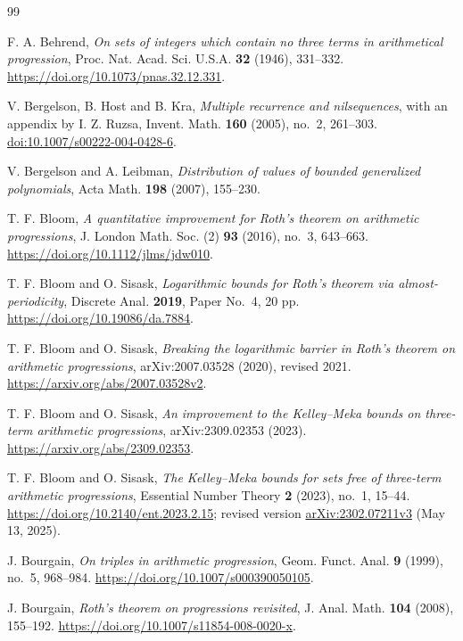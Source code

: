 \begin{thebibliography}{99}
\raggedright

F. A. Behrend, \emph{On sets of integers which contain no three terms in
arithmetical progression}, Proc. Nat. Acad. Sci. U.S.A. \textbf{32} (1946),
331--332. \url{https://doi.org/10.1073/pnas.32.12.331}.

V. Bergelson, B. Host and B. Kra, \emph{Multiple recurrence and nilsequences},
with an appendix by I. Z. Ruzsa,
Invent. Math. \textbf{160} (2005), no.~2, 261--303.
\href{https://doi.org/10.1007/s00222-004-0428-6}{doi:10.1007/s00222-004-0428-6}.

V. Bergelson and A. Leibman, \emph{Distribution of values of bounded
generalized polynomials}, Acta Math. \textbf{198} (2007), 155--230.

T. F. Bloom, \emph{A quantitative improvement for Roth's theorem on arithmetic
progressions}, J. London Math. Soc. (2) \textbf{93} (2016), no.~3, 643--663.
\url{https://doi.org/10.1112/jlms/jdw010}.

T. F. Bloom and O. Sisask, \emph{Logarithmic bounds for Roth's theorem via
almost-periodicity}, Discrete Anal. \textbf{2019}, Paper No.~4, 20 pp.
\url{https://doi.org/10.19086/da.7884}.

T. F. Bloom and O. Sisask, \emph{Breaking the logarithmic barrier in Roth's
theorem on arithmetic progressions}, arXiv:2007.03528 (2020), revised 2021.
\url{https://arxiv.org/abs/2007.03528v2}.

T. F. Bloom and O. Sisask, \emph{An improvement to the Kelley--Meka bounds on
three-term arithmetic progressions}, arXiv:2309.02353 (2023).
\url{https://arxiv.org/abs/2309.02353}.

T. F. Bloom and O. Sisask, \emph{The Kelley--Meka bounds for sets free of
three-term arithmetic progressions}, Essential Number Theory
\textbf{2} (2023), no.~1, 15--44.
\url{https://doi.org/10.2140/ent.2023.2.15};
revised version \href{https://arxiv.org/abs/2302.07211v3}{arXiv:2302.07211v3}
(May 13, 2025).

J. Bourgain, \emph{On triples in arithmetic progression},
Geom. Funct. Anal. \textbf{9} (1999), no.~5, 968--984.
\url{https://doi.org/10.1007/s000390050105}.

J. Bourgain, \emph{Roth's theorem on progressions revisited},
J. Anal. Math. \textbf{104} (2008), 155--192.
\url{https://doi.org/10.1007/s11854-008-0020-x}.


\end{thebibliography}
